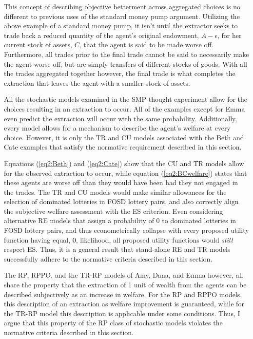 \documentclass[../main.tex]{subfiles}
\begin{document}
This concept of describing objective betterment across aggregated choices is no different to previous uses of the standard money pump argument.
Utilizing the above example of a standard money pump, it isn't until the extractor seeks to trade back a reduced quantity of the agent's original endowment, $A - \epsilon$, for her current stock of assets, $C$, that the agent is said to be made worse off.
Furthermore, all trades prior to the final trade cannot be said to necessarily make the agent worse off, but are simply transfers of different stocks of goods.
With all the trades aggregated together however, the final trade is what completes the extraction that leaves the agent with a smaller stock of assets.

All the stochastic models examined in the SMP thought experiment allow for the choices resulting in an extraction to occur.
All of the examples except for Emma even predict the extraction will occur with the same probability.
Additionally, every model allows for a mechanism to describe the agent's welfare at every choice.
However, it is only the TR and CU models associated with the Beth and Cate examples that satisfy the normative requirement described in this section.

Equations (\ref{eq2:Beth}) and (\ref{eq2:Cate}) show that the CU and TR models allow for the observed extraction to occur, while equation (\ref{eq2:BCwelfare}) states that these agents are worse off than they would have been had they not engaged in the trades.
The TR and CU models would make similar allowances for the selection of dominated lotteries in FOSD lottery pairs, and also correctly align the subjective welfare assessment with the ES criterion.
Even considering alternative RE models that assign a probability of $0$ to dominated lotteries in FOSD lottery pairs, and thus econometrically collapse with every proposed utility function having equal, $0$, likelihood, all proposed utility functions would \textit{still} respect ES.
Thus, it is a general result that stand-alone RE and TR models successfully adhere to the normative criteria described in this section.

The RP, RPPO, and the TR-RP models of Amy, Dana, and Emma however, all share the property that the extraction of 1 unit of wealth from the agents can be described subjectively as an increase in welfare.
For the RP and RPPO models, this description of an extraction as welfare improvement is guaranteed, while for the TR-RP model this description is applicable under some conditions.
Thus, I argue that this property of the RP class of stochastic models violates the normative criteria described in this section.
\end{document}
